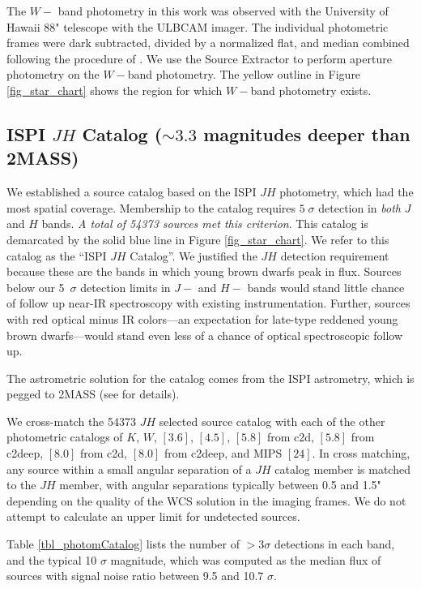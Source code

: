 The $W-$ band photometry in this work was observed with the University of Hawaii 88" telescope with the ULBCAM imager.  The individual photometric frames were dark subtracted, divided by a normalized flat, and median combined following the procedure of \cite{allers06}.  We use the Source Extractor \citep{1996A&AS..117..393B} to perform aperture photometry on the $W-$band photometry.  The yellow outline in Figure \ref{fig_star_chart} shows the region for which $W-$band photometry exists.



\subsection{ISPI $JH$ Catalog ($\sim3.3$ magnitudes deeper than 2MASS)}
We established a source catalog based on the ISPI $JH$ photometry, which had the most spatial coverage.  Membership to the catalog requires $5\; \sigma$ detection in \emph{both} $J$ and $H$ bands.  \emph{A total of 54373 sources met this criterion}.  This catalog is demarcated by the solid blue line in Figure \ref{fig_star_chart}.  We refer to this catalog as the ``ISPI $JH$ Catalog''.  We justified the $JH$ detection requirement because these are the bands in which young brown dwarfs peak in flux.   Sources below our 5~$\sigma$ detection limits in $J-$ and $H-$ bands would stand little chance of follow up near-IR spectroscopy with existing instrumentation.  Further, sources with red optical minus IR colors---an expectation for late-type reddened young brown dwarfs---would stand even less of a chance of optical spectroscopic follow up.  

The astrometric solution for the catalog comes from the ISPI astrometry, which is pegged to 2MASS (see \citet{allers06} for details).

We cross-match the 54373 $JH$ selected source catalog with each of the other photometric catalogs of $K$, $W$, $[3.6]$, $[4.5]$, $[5.8]$ from c2d, $[5.8]$ from c2deep, $[8.0]$ from c2d, $[8.0]$ from c2deep, and MIPS $[24]$. In cross matching, any source within a small angular separation of a $JH$ catalog member is matched to the $JH$ member, with angular separations typically between 0.5 and 1.5" depending on the quality of the WCS solution in the imaging frames.  We do not attempt to calculate an upper limit for undetected sources.

Table \ref{tbl_photomCatalog} lists the number of $>3\sigma$ detections in each band, and the typical 10 $\sigma$ magnitude, which was computed as the median flux of sources with signal noise ratio between 9.5 and 10.7 $\sigma$.


